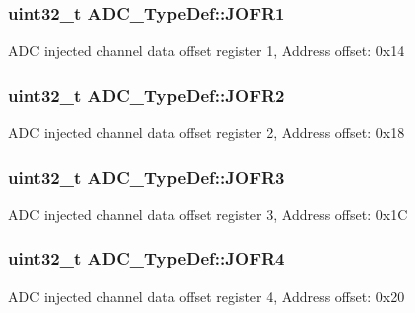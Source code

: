 \subsubsection[{\texorpdfstring{J\+O\+F\+R1}{JOFR1}}]{ uint32\+\_\+t A\+D\+C\+\_\+\+Type\+Def\+::\+J\+O\+F\+R1}\hypertarget{struct_a_d_c___type_def_aa005e656f528aaad28d70d61c9db9b81}{}\label{struct_a_d_c___type_def_aa005e656f528aaad28d70d61c9db9b81}
A\+DC injected channel data offset register 1, Address offset\+: 0x14 
\subsubsection[{\texorpdfstring{J\+O\+F\+R2}{JOFR2}}]{ uint32\+\_\+t A\+D\+C\+\_\+\+Type\+Def\+::\+J\+O\+F\+R2}\hypertarget{struct_a_d_c___type_def_aa20f76044c11042dde41c1060853fb82}{}\label{struct_a_d_c___type_def_aa20f76044c11042dde41c1060853fb82}
A\+DC injected channel data offset register 2, Address offset\+: 0x18 
\subsubsection[{\texorpdfstring{J\+O\+F\+R3}{JOFR3}}]{ uint32\+\_\+t A\+D\+C\+\_\+\+Type\+Def\+::\+J\+O\+F\+R3}\hypertarget{struct_a_d_c___type_def_ae9c78142f6edf8122384263878d09015}{}\label{struct_a_d_c___type_def_ae9c78142f6edf8122384263878d09015}
A\+DC injected channel data offset register 3, Address offset\+: 0x1C 
\subsubsection[{\texorpdfstring{J\+O\+F\+R4}{JOFR4}}]{ uint32\+\_\+t A\+D\+C\+\_\+\+Type\+Def\+::\+J\+O\+F\+R4}\hypertarget{struct_a_d_c___type_def_a92f5c1a5aaa8b286317f923482e09d35}{}\label{struct_a_d_c___type_def_a92f5c1a5aaa8b286317f923482e09d35}
A\+DC injected channel data offset register 4, Address offset\+: 0x20 
